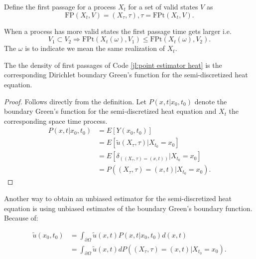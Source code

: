 \documentclass[a4paper,12pt]{article}
\begin{document}
\begin{definition} \label{def:first passage}
  Define the first passage for a process $X_{t}$ for a set of valid states
  $V$ as
  \begin{equation}
    \text{FP}(X_{t},V)=(X_{\tau},\tau), \tau = \text{FPt}(X_{t},V)
    .
  \end{equation}
\end{definition}

\begin{lemma} \label{lem: FP order}
  When a process has more valid states the first passage time gets larger i.e.
  \begin{equation}
    V_{1} \subset V_{2} \Rightarrow
    \text{FPt}(X_{t}(\omega),V_{1}) \le  \text{FPt}(X_{t}(\omega),V_{2}) .
  \end{equation}
  The $\omega$ is to indicate we mean the same realization of $X_{t}$.
\end{lemma}

\begin{theorem}
  The the density of first passages of Code \ref{jl:point estimator heat} is  the
  corresponding Dirichlet boundary Green's function for the semi-discretized heat equation.
\end{theorem}

\begin{proof}
  Follows directly from the definition.
  Let $P(x,t|x_{0},t_{0})$ denote the boundary Green's
  function for the semi-discretized heat equation and $X_{t}$
  the corresponding space time process.
  \begin{align}
    P(x,t|x_{0},t_{0}) & = E[Y(x_0,t_0)]                                         \\
                       & = E[\tilde{u}(X_{\tau},\tau) | X_{t_0} = x_0 ]          \\
                       & = E[\delta_{((X_{\tau},\tau) = (x,t))}| X_{t_0} = x_0 ] \\
                       & = P((X_{\tau},\tau) = (x,t)| X_{t_0} = x_0 )
    .
  \end{align}
\end{proof}


Another way to obtain an unbiased estimator for the semi-discretized heat equation is using unbiased estimates
of the boundary Green's boundary function. Because of:

\begin{align}
  \tilde{u}(x_{0},t_{0}) & = \int_{\partial \Omega} \tilde{u}(x,t) P(x,t|x_{0},t_{0}) d(x,t)                    \\
                         & = \int_{\partial \Omega} \tilde{u}(x,t)  dP((X_{\tau},\tau) = (x,t)| X_{t_0} = x_0 )
  .
\end{align}
\end{document}
